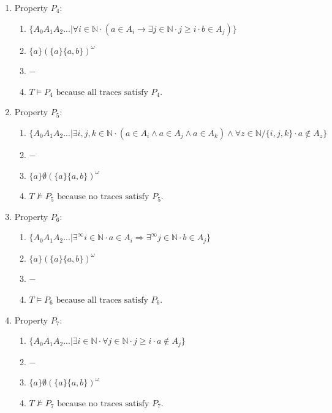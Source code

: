 \documentclass{article}
\newcommand{\N}{\mathbb{N}}
\begin{document}
\begin{enumerate}
    \item Property $P_4:$
    \begin{enumerate}[i]
        \item 
        $
            \{ A_0 A_1 A_2 ... | \forall i \in \N \cdot (a \in A_i \longrightarrow \exists j \in \N \cdot j \geq i \cdot b\in A_j) \}
        $
        \item 
        $
            \{a\} (\{a\}\{a,b\})^\omega
        $
        \item 
        $
            -
        $
        \item 
        $
            T \vDash P_4 \text{ because all traces satisfy $P_4$}.
        $
    \end{enumerate}

    \item Property $P_5:$
    \begin{enumerate}[i]
        \item 
        $
            \{ A_0 A_1 A_2 ... |\exists i,j,k \in \N \cdot (a\in A_i \wedge a\in A_j \wedge a\in A_k) \wedge \forall z \in \N / \{i,j,k\} \cdot a\notin A_z \}
        $
        \item 
        $
            -
        $
        \item 
        $
            \{a\} \emptyset (\{a\}\{a,b\})^\omega
        $
        \item 
        $
            T \nvDash P_5 \text{ because no traces satisfy $P_5$}.
        $
    \end{enumerate}

    \item Property $P_6:$
    \begin{enumerate}[i]
        \item 
        $
            \{ A_0 A_1 A_2 ... |{\exists}^\infty i\in \N \cdot a\in A_i \Longrightarrow {\exists}^\infty j\in \N \cdot b\in A_j \}
        $
        \item 
        $
            \{a\} (\{a\}\{a,b\})^\omega
        $
        \item 
        $
            -
        $
        \item 
        $
            T \vDash P_6 \text{ because all traces satisfy $P_6$}.
        $
    \end{enumerate}

    \item Property $P_7:$
    \begin{enumerate}[i]
        \item 
        $
            \{ A_0 A_1 A_2 ... |\exists i \in \N \cdot \forall j\in \N \cdot j\geq i \cdot a\notin A_j \}
        $
        \item 
        $
            -
        $
        \item 
        $
            \{a\} \emptyset (\{a\}\{a,b\})^\omega
        $
        \item 
        $
            T \nvDash P_7 \text{ because no traces satisfy $P_7$}.
        $
    \end{enumerate}
\end{enumerate}
\end{document}

